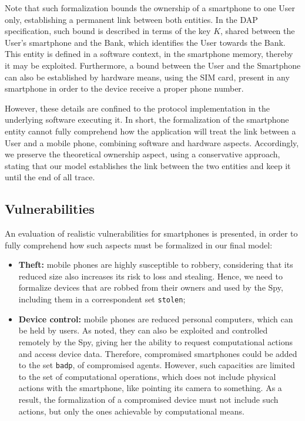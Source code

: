 Note that such formalization bounds the ownership of a smartphone to one User only, establishing a permanent link between both entities. In the DAP specification, such bound is described in terms of the key $K$, shared between the User's smartphone and the Bank, which identifies the User towards the Bank. This entity is defined in a software context, in the smartphone memory, thereby it may be exploited. Furthermore, a bound between the User and the Smartphone can also be established by hardware means, using the SIM card, present in any smartphone in order to the device receive a proper phone number.

However, these details are confined to the protocol implementation in the underlying software executing it. In short, the formalization of the smartphone entity cannot fully comprehend how the application will treat the link between a User and a mobile phone, combining software and hardware aspects. Accordingly, we preserve the theoretical ownership aspect, using a conservative approach, stating that our model establishes the link between the two entities and keep it until the end of all trace.



\subsection{Vulnerabilities}
An evaluation of realistic vulnerabilities for smartphones is presented, in order to fully comprehend how such aspects must be formalized in our final model:

\begin{itemize}
  \item \textbf{Theft:} mobile phones are highly susceptible to robbery, considering that its reduced size also increases its risk to loss and stealing. Hence, we need to formalize devices that are robbed from their owners and used by the Spy, including them in a correspondent set \texttt{stolen};

  \item \textbf{Device control:} mobile phones are reduced personal computers, which can be held by users. As noted, they can also be exploited and controlled remotely by the Spy, giving her the ability to request computational actions and access device data. Therefore, compromised smartphones could be added to the set \texttt{badp}, of compromised agents. However, such capacities are limited to the set of computational operations, which does not include physical actions with the smartphone, like pointing its camera to something. As a result, the formalization of a compromised device must not include such actions, but only the ones achievable by computational means.
\end{itemize}

